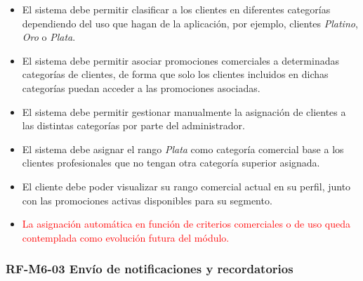\begin{itemize}
    \item El sistema debe permitir clasificar a los clientes en diferentes categorías dependiendo del uso que hagan de la aplicación, por ejemplo, clientes \textit{Platino}, \textit{Oro} o \textit{Plata}.
    \item El sistema debe permitir asociar promociones comerciales a determinadas categorías de clientes, de forma que solo los clientes incluidos en dichas categorías puedan acceder a las promociones asociadas.
    \item El sistema debe permitir gestionar manualmente la asignación de clientes a las distintas categorías por parte del administrador.
    \item El sistema debe asignar el rango \textit{Plata} como categoría comercial base a los clientes profesionales que no tengan otra categoría superior asignada.
    \item El cliente debe poder visualizar su rango comercial actual en su perfil, junto con las promociones activas disponibles para su segmento.
    \item \textcolor{red}{La asignación automática en función de criterios comerciales o de uso queda contemplada como evolución futura del módulo.}
\end{itemize}

\vspace{-0.75em}
\subsubsection{RF-M6-03 Envío de notificaciones y recordatorios}
\vspace{-1em}

